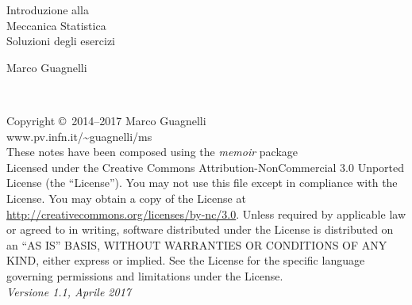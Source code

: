 \begingroup
\thispagestyle{empty}
{\flushright
\vspace*{6cm}
\par\normalfont\fontsize{35}{35}\sffamily\selectfont

Introduzione alla \\
\vspace*{16pt}
Meccanica Statistica \\
\vspace*{32pt}
Soluzioni degli esercizi\par %

\vspace*{2cm}
{\huge Marco Guagnelli}\par %
}
\endgroup


\newpage
~\vfill
\thispagestyle{empty}

\noindent Copyright \copyright\ 2014--2017 Marco Guagnelli\\ %

\noindent www.pv.infn.it/\textasciitilde guagnelli/ms\\ %

\noindent These notes have been composed using the {\em memoir} package\\

\noindent Licensed under the Creative Commons Attribution-NonCommercial 3.0 Unported License (the ``License''). You may not use this file except in compliance with the License. You may obtain a copy of the License at \url{http://creativecommons.org/licenses/by-nc/3.0}. Unless required by applicable law or agreed to in writing, software distributed under the License is distributed on an \textsc{``AS IS'' BASIS, WITHOUT WARRANTIES OR CONDITIONS OF ANY KIND}, either express or implied. See the License for the specific language governing permissions and limitations under the License.\\ %

\noindent \textit{Versione 1.1, Aprile 2017} %
\cleardoublepage


\pagestyle{empty} %
\tableofcontents %
\cleardoublepage %
\pagestyle{ruled} %



